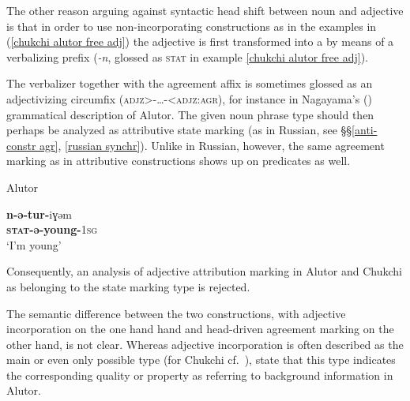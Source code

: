 The other reason arguing against syntactic head shift between noun and adjective is that in order to use non-incorporating constructions as in the examples in (\ref{chukchi alutor free adj}) the adjective is first transformed into a  by means of a verbalizing prefix (\textit{-n}, glossed as \textsc{stat} in example \ref{chukchi alutor free adj}).

The verbalizer together with the agreement affix is sometimes glossed as an adjectivizing circumfix (\textsc{adjz>-\dots-<adjz:agr}), for instance in Nagayama's (\citeyear{nagayama2003}) grammatical description of Alutor. The given noun phrase type should then perhaps be analyzed as attributive state marking (as in Russian, see \S\S\ref{anti-constr agr}, \ref{russian synchr}). Unlike in Russian, however, the same agreement marking as in attributive constructions shows up on predicates as well.
\begin{exe}
\ex \rm{Alutor \citep{nagayama2003}}
\begin{xlist}
\ex
\gll	\textbf{n-ə-tur-}iɣəm\\
	\textbf{\textsc{stat}-ə-young-}\textsc{1sg}\\
\glt	‘I'm young’
\end{xlist}
\end{exe}
Consequently, an analysis of adjective attribution marking in Alutor and Chukchi as belonging to the state marking type is rejected.

The semantic difference between the two constructions, with adjective incorporation on the one hand hand and head\hyp{}driven agreement marking on the other hand, is not clear. Whereas adjective incorporation is often described as the main or even only possible type (for Chukchi cf.~\citealt[37, 101]{kampfe-etal1995}), \citet[288]{kibrik-etal2000} state that this type indicates the corresponding quality or property as referring to background information in Alutor.

